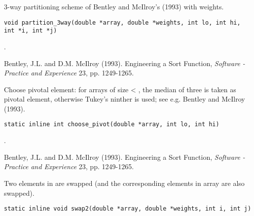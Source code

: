 \documentclass[a4paper,oneside,10pt,DIV=12]{scrreprt}
\begin{document}
\begin{Description}
3-way partitioning scheme of Bentley and McIlroy's (1993) with weights. 
\end{Description}
\begin{Usage}
\begin{verbatim}
void partition_3way(double *array, double *weights, int lo, int hi, int *i, int *j)
\end{verbatim}
\end{Usage}
\begin{Dependency}
	. 
\end{Dependency}
\begin{References}
	Bentley, J.L. and D.M. McIlroy (1993). Engineering a Sort Function, 
	\textit{Software - Practice and Experience} 23, pp. 1249-1265.
\end{References}

\begin{Description}
Choose pivotal element: for arrays of size < , the 
median of three is taken as pivotal element, otherwise Tukey's ninther is
used; see e.g. Bentley and McIlroy (1993). 
\end{Description}
\begin{Usage}
\begin{verbatim}
static inline int choose_pivot(double *array, int lo, int hi)
\end{verbatim}
\end{Usage}
\begin{Dependency}
	.
\end{Dependency}
\begin{References}
Bentley, J.L. and D.M. McIlroy (1993). Engineering a Sort Function, 
\textit{Software - Practice and Experience} 23, pp. 1249-1265.
\end{References}

\begin{Description}
Two elements in  are swapped (and the corresponding elements in
array  are also swapped). 
\end{Description}
\begin{Usage}
\begin{verbatim}
static inline void swap2(double *array, double *weights, int i, int j)
\end{verbatim}
\end{Usage}
\end{document}
